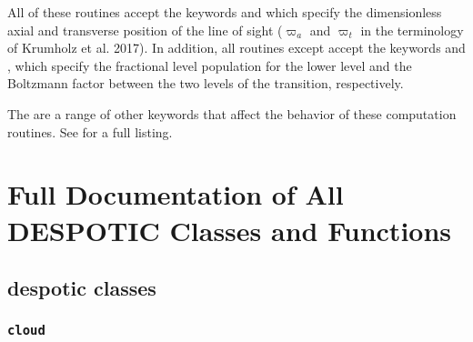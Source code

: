 \documentclass[letterpaper,10pt,english]{sphinxmanual}
\begin{document}
All of these routines accept the keywords  and 
which specify the dimensionless axial and transverse position of the
line of sight (\(\varpi_a\) and \(\varpi_t\) in the
terminology of Krumholz et al. 2017). In addition, all routines except
 accept the keywords  and , which
specify the fractional level population for the lower level and the
Boltzmann factor between the two levels of the transition,
respectively.

The are a range of other keywords that affect the behavior of these
computation routines. See {\hyperref[fulldoc:sssec\string-full\string-pwind]{}} for a full
listing.


\chapter{Full Documentation of All DESPOTIC Classes and Functions}
\label{fulldoc:sec-fulldoc}\label{fulldoc::doc}\label{fulldoc:full-documentation-of-all-despotic-classes-and-functions}

\section{despotic classes}
\label{fulldoc:despotic-classes}

\subsection{\texttt{cloud}}
\label{fulldoc:sssec-full-cloud}\label{fulldoc:cloud}
\end{document}
